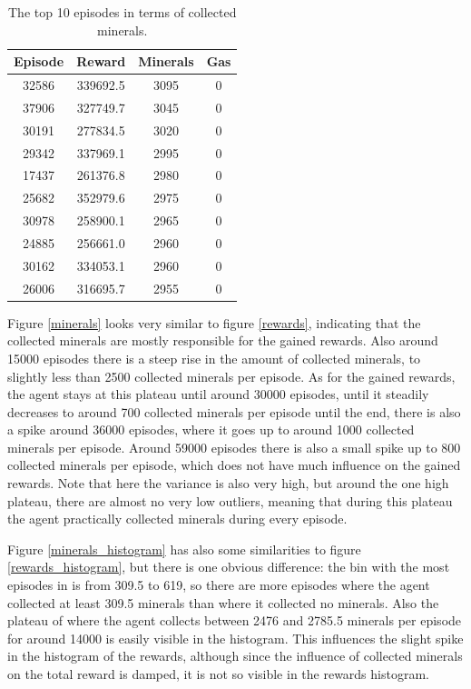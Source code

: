 \documentclass{article}
\begin{document}
\begin{table}
\begin{tabular}{|c|c|c|c|}
\hline
Episode & Reward & Minerals & Gas\\
\hline
32586 & 339692.5 & 3095 & 0 \\
37906 & 327749.7 & 3045 & 0 \\
30191 & 277834.5 & 3020 & 0 \\
29342 & 337969.1 & 2995 & 0 \\
17437 & 261376.8 & 2980 & 0 \\
25682 & 352979.6 & 2975 & 0 \\
30978 & 258900.1 & 2965 & 0 \\
24885 & 256661.0 & 2960 & 0 \\
30162 & 334053.1 & 2960 & 0 \\
26006 & 316695.7 & 2955 & 0 \\
\hline
\end{tabular}
\caption{The top 10 episodes in terms of collected minerals.}
\label{minerals_table}
\end{table}

Figure \ref{minerals} looks very similar to figure \ref{rewards}, indicating 
that the collected minerals are mostly responsible for the gained rewards. Also 
around 15000 episodes there is a steep rise in the amount of collected 
minerals, to slightly less than 2500 collected minerals per episode. As for the 
gained rewards, the agent stays at this plateau until around 30000 episodes, 
until it steadily decreases to around 700 collected minerals per episode until 
the end, there is also a spike around 36000 episodes, where it goes up to 
around 1000 collected minerals per episode. Around 59000 episodes there is also 
a small spike up to 800 collected minerals per episode, which does not have 
much influence on the gained rewards. Note that here the variance is also very 
high, but around the one high plateau, there are almost no very low outliers, 
meaning that during this plateau the agent practically collected minerals 
during every episode.

Figure \ref{minerals_histogram} has also some similarities to figure 
\ref{rewards_histogram}, but there is one obvious difference: the bin with the 
most episodes in is from 309.5 to 619, so there are more episodes where the 
agent collected at least 309.5 minerals than where it collected no minerals. 
Also the plateau of where the agent collects between 2476 and 2785.5 minerals  
per episode for around 14000 is easily visible in the histogram. This 
influences the slight spike in the histogram of the rewards, although since the 
influence of collected minerals on the total reward is damped, it is not so 
visible in the rewards histogram.
\end{document}
